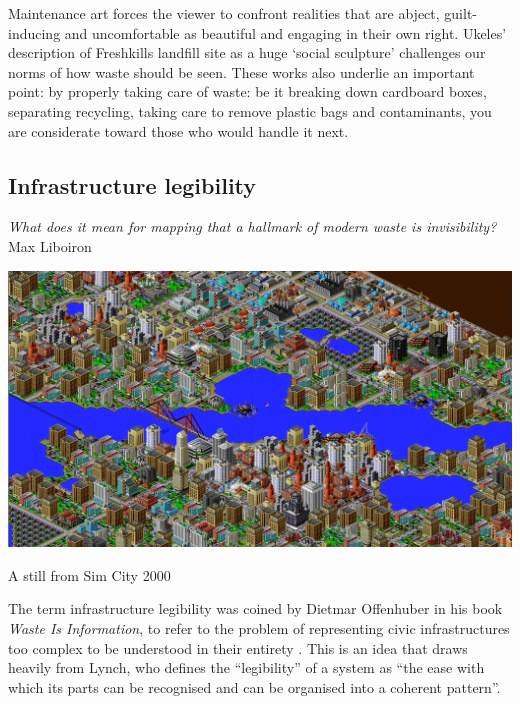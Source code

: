 \documentclass[nofonts,nols,justified,nobib]{tufte-book}
\begin{document}
Maintenance art forces the viewer to confront realities that are abject, guilt-inducing and uncomfortable as beautiful and engaging in their own right. Ukeles' description of  Freshkills landfill site as a huge `social sculpture' challenges our norms of how waste should be seen\cite{cotter_artist_2017}. These works also underlie an important point: by properly taking care of waste: be it breaking down cardboard boxes, separating recycling, taking care to remove plastic bags and contaminants, you are considerate toward those who would handle it next.

\subsection*{Infrastructure legibility}

\begin{flushright}
\emph{What does it mean for mapping that a hallmark of modern waste is invisibility?}
\cite{liboiron_mapping_2014}\\
Max Liboiron
\end{flushright}

\begin{marginfigure}
\includegraphics[width=\textwidth]{img/1/sim-city.png}
\caption{A still from Sim City 2000}
\end{marginfigure}

The term infrastructure legibility was coined by Dietmar Offenhuber in his book \emph{Waste Is Information}, to refer to the problem of representing civic infrastructures too complex to be understood in their entirety \cite{offenhuber_waste_2017}. This is an idea that draws heavily from Lynch, who defines the ``legibility'' of a system as ``the ease with which its parts can be recognised and can be organised into a coherent pattern''. 
\end{document}
